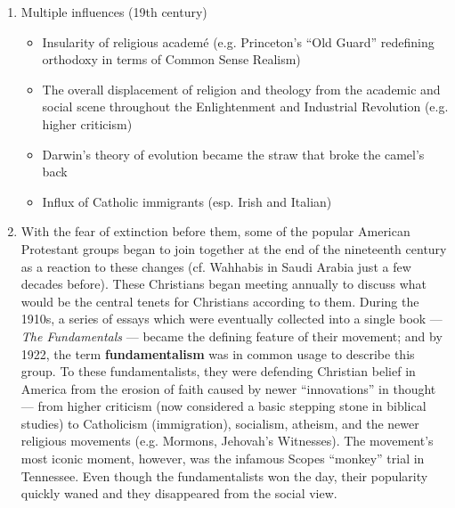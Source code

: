 \documentclass[11pt]{article}
\begin{document}
\begin{enumerate}
	\item Multiple influences (19th century)
		\begin{itemize}
			\item Insularity of religious academ\'e (e.g. Princeton's \enquote{Old Guard} redefining orthodoxy in terms of Common Sense Realism)
			\item The overall displacement of religion and theology from the academic and social scene throughout the Enlightenment and Industrial Revolution (e.g. higher criticism)
			\item Darwin's theory of evolution became the straw that broke the camel's back
			\item Influx of Catholic immigrants (esp. Irish and Italian)
		\end{itemize}

	\item With the fear of extinction before them, some of the popular American Protestant groups began to join together at the end of the nineteenth century as a reaction to these changes (cf. Wahhabis in Saudi Arabia just a few decades before). These Christians began meeting annually to discuss what would be the central tenets for Christians according to them. During the 1910s, a series of essays which were eventually collected into a single book --- \emph{The Fundamentals} --- became the defining feature of their movement; and by 1922, the term \textbf{fundamentalism} was in common usage to describe this group. To these fundamentalists, they were defending Christian belief in America from the erosion of faith caused by newer \enquote{innovations} in thought --- from higher criticism (now considered a basic stepping stone in biblical studies) to Catholicism (immigration), socialism, atheism, and the newer religious movements (e.g. Mormons, Jehovah's Witnesses). The movement's most iconic moment, however, was the infamous Scopes \enquote{monkey} trial in Tennessee. Even though the fundamentalists won the day, their popularity quickly waned and they disappeared from the social view.


\end{enumerate}
\end{document}
